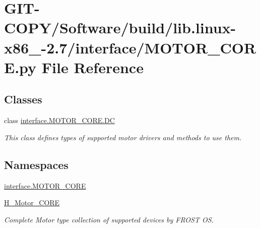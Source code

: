 \hypertarget{GIT-COPY_2Software_2build_2lib_8linux-x86__64-2_87_2interface_2MOTOR__CORE_8py}{}\section{G\+I\+T-\/\+C\+O\+P\+Y/\+Software/build/lib.linux-\/x86\+\_-\/2.7/interface/\+M\+O\+T\+O\+R\+\_\+\+C\+O\+R\+E.py File Reference}
\label{GIT-COPY_2Software_2build_2lib_8linux-x86__64-2_87_2interface_2MOTOR__CORE_8py}
\subsection*{Classes}
\begin{DoxyCompactItemize}
\item 
class \hyperlink{classinterface_1_1MOTOR__CORE_1_1DC}{interface.\+M\+O\+T\+O\+R\+\_\+\+C\+O\+R\+E.\+D\+C}
\begin{DoxyCompactList}\small\item\em This class defines types of supported motor drivers and methods to use them. \end{DoxyCompactList}\end{DoxyCompactItemize}
\subsection*{Namespaces}
\begin{DoxyCompactItemize}
\item 
 \hyperlink{namespaceinterface_1_1MOTOR__CORE}{interface.\+M\+O\+T\+O\+R\+\_\+\+C\+O\+R\+E}
\item 
 \hyperlink{namespaceH__Motor__CORE}{H\+\_\+\+Motor\+\_\+\+C\+O\+R\+E}
\begin{DoxyCompactList}\small\item\em Complete Motor type collection of supported devices by F\+R\+O\+S\+T O\+S. \end{DoxyCompactList}\end{DoxyCompactItemize}
